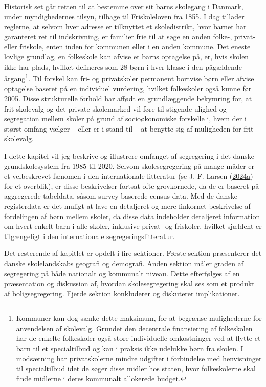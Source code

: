 \documentclass[
]{book}
\begin{document}
Historisk set går retten til at bestemme over sit barns skolegang i Danmark, under myndighedernes tilsyn, tilbage til Friskoleloven fra 1855. I dag tillader reglerne, at selvom hver adresse er tilknyttet et skoledistrikt, hvor barnet har garanteret ret til indskrivning, er familier frie til at søge en anden folke-, privat- eller friskole, enten inden for kommunen eller i en anden kommune. Det eneste lovlige grundlag, en folkeskole kan afvise et barns optagelse på, er, hvis skolen ikke har plads, hvilket defineres som 28 børn i hver klasse i den pågældende årgang\footnote{Kommuner kan dog sænke dette maksimum, for at begrænse mulighederne for anvendelsen af skolevalg. Grundet den decentrale finansiering af folkeskolen har de enkelte folkeskoler også store individuelle omkostninger ved at flytte et barn til et specialtilbud og kan i praksis ikke udelukke børn fra skolen. I modsætning har privatskolerne mindre udgifter i forbindelse med henvisninger til specialtilbud idet de søger disse midler hos staten, hvor folkeskolerne skal finde midlerne i deres kommunalt allokerede budget.}. Til forskel kan fri- og privatskoler permanent bortvise børn eller afvise optagelse baseret på en individuel vurdering, hvilket folkeskoler også kunne før 2005. Disse strukturelle forhold har affødt en grundlæggende bekymring for, at frit skolevalg og det private skolemarked vil føre til stigende ulighed og segregation mellem skoler på grund af socioøkonomiske forskelle i, hvem der i størst omfang vælger -- eller er i stand til -- at benytte sig af muligheden for frit skolevalg.

I dette kapitel vil jeg beskrive og illustrere omfanget af segregering i det danske grundskolesystem fra 1985 til 2020. Selvom skolesegregering på mange måder er et velbeskrevet fænomen i den internationale litteratur (se J. F. Larsen (\protect\hyperlink{ref-larsen2024a}{2024a}) for et overblik), er disse beskrivelser fortsat ofte grovkornede, da de er baseret på aggregerede tabeldata, såsom survey-baserede census data. Med de danske registerdata er det muligt at lave en detaljeret og mere finkornet beskrivelse af fordelingen af børn mellem skoler, da disse data indeholder detaljeret information om hvert enkelt barn i alle skoler, inklusive privat- og friskoler, hvilket sjældent er tilgængeligt i den internationale segregeringslitteratur.

Det resterende af kapitlet er opdelt i fire sektioner. Første sektion præsenterer det danske skolelandskabs geografi og demografi. Anden sektion måler graden af segregering på både nationalt og kommunalt niveau. Dette efterfølges af en præsentation og diskussion af, hvordan skolesegregering skal ses som et produkt af boligsegregering. Fjerde sektion konkluderer og diskuterer implikationer.
\end{document}
